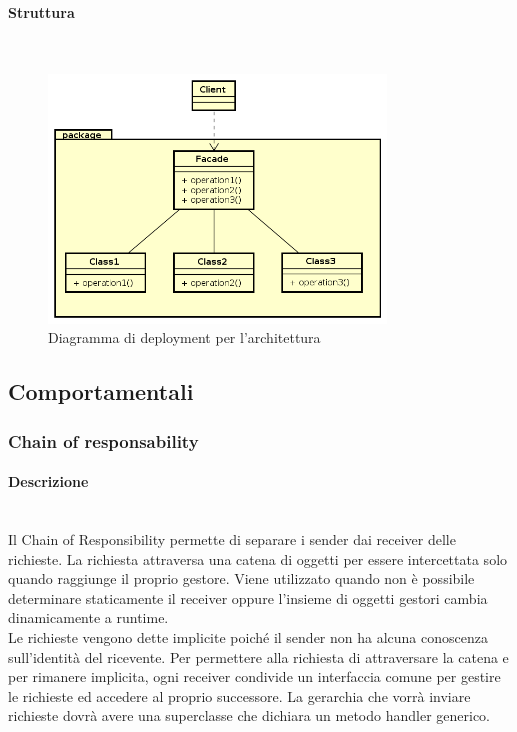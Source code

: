 \paragraph{Struttura} \mbox{} \\
\begin{figure}[h]
\centering
\includegraphics[width=0.8\textwidth]{res/sections/backend/facade.png}
\caption{Diagramma di deployment per l'architettura}
\end{figure}
\subsection{Comportamentali}
\subsubsection{Chain of responsability}
\paragraph{Descrizione} \mbox{} \\
Il Chain of Responsibility permette di separare i sender dai receiver delle richieste. La richiesta attraversa una catena di oggetti per essere intercettata solo quando raggiunge il proprio gestore. Viene utilizzato quando non è possibile determinare staticamente il receiver oppure l’insieme di oggetti gestori cambia dinamicamente a runtime. \\
Le richieste vengono dette implicite poiché il sender non ha alcuna conoscenza sull’identità del ricevente. Per permettere alla richiesta di attraversare la catena e per rimanere implicita, ogni receiver condivide un interfaccia comune per gestire le richieste ed accedere al proprio successore. La gerarchia che vorrà inviare richieste dovrà avere una superclasse che dichiara un metodo handler generico.
